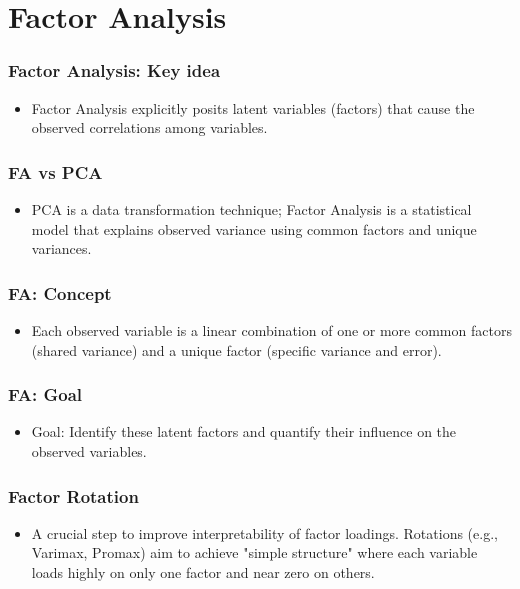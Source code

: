 \documentclass{beamer}
\begin{document}
\section{Factor Analysis}

\begin{frame}
    \frametitle{Factor Analysis: Key idea}
    \begin{itemize}
        \item Factor Analysis explicitly posits \alert{latent variables} (factors) that cause the observed correlations among variables.
    \end{itemize}
\end{frame}

\begin{frame}
    \frametitle{FA vs PCA}
    \begin{itemize}
        \item PCA is a data transformation technique; Factor Analysis is a statistical model that explains observed variance using common factors and unique variances.
    \end{itemize}
\end{frame}

\begin{frame}
    \frametitle{FA: Concept}
    \begin{itemize}
        \item Each observed variable is a linear combination of one or more common factors (shared variance) and a unique factor (specific variance and error).
    \end{itemize}
\end{frame}

\begin{frame}
    \frametitle{FA: Goal}
    \begin{itemize}
        \item Goal: Identify these latent factors and quantify their influence on the observed variables.
    \end{itemize}
\end{frame}

\begin{frame}
    \frametitle{Factor Rotation}
    \begin{itemize}
        \item A crucial step to improve interpretability of factor loadings. Rotations (e.g., Varimax, Promax) aim to achieve "simple structure" where each variable loads highly on only one factor and near zero on others.
    \end{itemize}
\end{frame}
\end{document}
